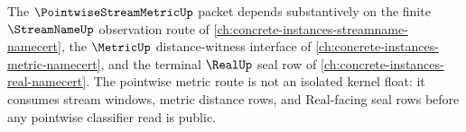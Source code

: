 The $\PointwiseStreamMetricUp$ packet depends substantively on the finite $\StreamNameUp$ observation route of \autoref{ch:concrete-instances-streamname-namecert}, the $\MetricUp$ distance-witness interface of \autoref{ch:concrete-instances-metric-namecert}, and the terminal $\RealUp$ seal row of \autoref{ch:concrete-instances-real-namecert}. The pointwise metric route is not an isolated kernel float: it consumes stream windows, metric distance rows, and Real-facing seal rows before any pointwise classifier read is public.
